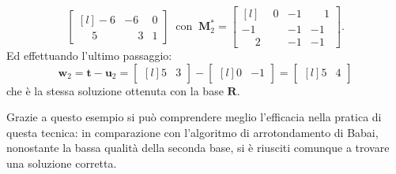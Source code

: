 \begin{exmp}
\begin{equation*}
\begin{bmatrix*}[l]
        -6 & -6           & 0\\
        \phantom{-}5 & \phantom{-}3 & 1
    \end{bmatrix*}
    \ \text{ con } \
    \mathbf{M}_2^* =
    \begin{bmatrix*}[l]
        \phantom{-}0 & -1 & \phantom{-}1\\
        -1 & -1 & -1\\
        \phantom{-}2 & -1 & -1
    \end{bmatrix*}.
\end{equation*}
Ed effettuando l'ultimo passaggio:
\begin{equation*}
    \mathbf{w}_2 = \mathbf{t} - \mathbf{u}_2 =
    \begin{bmatrix*}[l]
        5 & 3
    \end{bmatrix*}
    -
    \begin{bmatrix*}[l]
        0 & -1
    \end{bmatrix*}
    =
    \begin{bmatrix*}[l]
        5 & 4
    \end{bmatrix*}
\end{equation*}
che è la stessa soluzione ottenuta con la base $\mathbf{R}$. 
\end{exmp}
Grazie a questo esempio si può comprendere meglio l'efficacia nella pratica di questa tecnica:
in comparazione con l'algoritmo di arrotondamento di Babai, nonostante la bassa qualità
della seconda base, si è riusciti comunque a trovare una soluzione corretta.



